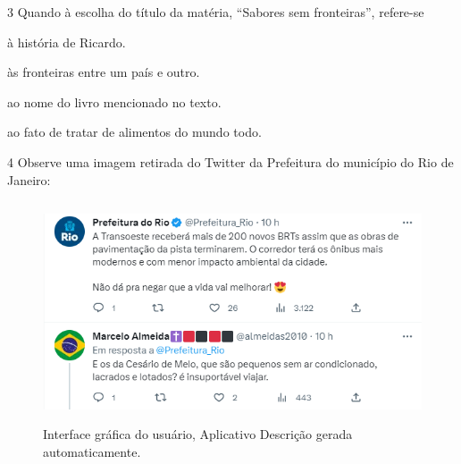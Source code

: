 \num{3} Quando à escolha do título da matéria, ``Sabores sem fronteiras'',
refere-se

\begin{escolha}
\item à história de Ricardo.
\item às fronteiras entre um país e outro.
\item ao nome do livro mencionado no texto.
\item ao fato de tratar de alimentos do mundo todo.
\end{escolha}



\num{4} Observe uma imagem retirada do Twitter da Prefeitura do
município do Rio de Janeiro:

\begin{figure}[H]
\centering\includegraphics[width=4.97543in,height=2.56689in]{./imgSAEB_6_POR/media/image6.png}
\caption{Interface gráfica do usuário, Aplicativo Descrição gerada
automaticamente.}
\end{figure}

